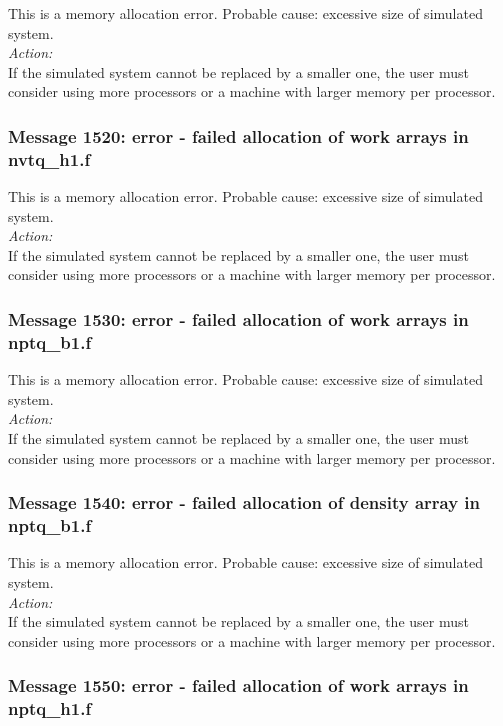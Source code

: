 This is a memory allocation error. Probable cause: excessive size of
simulated system. \\

\noindent
{\em Action:}\\
If the simulated system cannot be replaced by a smaller one, the user
must consider using more processors or a machine with larger memory
per processor.

\subsubsection*{Message 1520: error - failed allocation of work arrays
in nvtq\_h1.f}

This is a memory allocation error. Probable cause: excessive size of
simulated system. \\

\noindent
{\em Action:}\\
If the simulated system cannot be replaced by a smaller one, the user
must consider using more processors or a machine with larger memory
per processor.

\subsubsection*{Message 1530: error - failed allocation of work arrays
in nptq\_b1.f}

This is a memory allocation error. Probable cause: excessive size of
simulated system. \\

\noindent
{\em Action:}\\
If the simulated system cannot be replaced by a smaller one, the user
must consider using more processors or a machine with larger memory
per processor.

\subsubsection*{Message 1540: error - failed allocation of density
array in nptq\_b1.f}

This is a memory allocation error. Probable cause: excessive size of
simulated system. \\

\noindent
{\em Action:}\\
If the simulated system cannot be replaced by a smaller one, the user
must consider using more processors or a machine with larger memory
per processor.

\subsubsection*{Message 1550: error - failed allocation of work arrays
in nptq\_h1.f}

